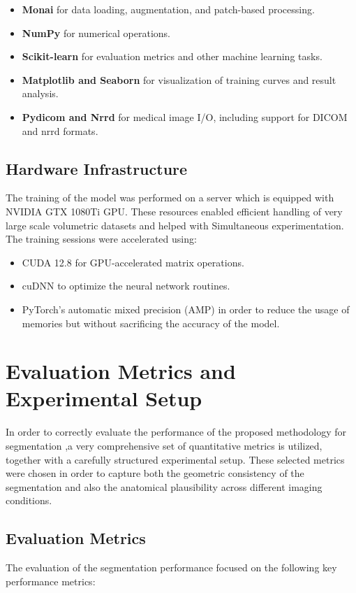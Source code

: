 \begin{itemize} \item \textbf{Monai} for data loading, augmentation, and patch-based processing. \item \textbf{NumPy} for numerical operations. \item \textbf{Scikit-learn} for evaluation metrics and other machine learning tasks. \item \textbf{Matplotlib and Seaborn} for visualization of training curves and result analysis. \item \textbf{Pydicom and Nrrd} for medical image I/O, including support for DICOM and nrrd formats. \end{itemize}

\subsection{Hardware Infrastructure}
The training of the model was performed on a server which is equipped with NVIDIA GTX 1080Ti GPU. These resources enabled efficient handling of very large scale volumetric datasets and helped with Simultaneous experimentation. The training sessions were accelerated using:

\begin{itemize} \item CUDA 12.8 for GPU-accelerated matrix operations. \item cuDNN to optimize the neural network routines. \item PyTorch's automatic mixed precision (AMP) in order to reduce the usage of memories but without sacrificing the accuracy of the model. \end{itemize}

\section{Evaluation Metrics and Experimental Setup}
In order to correctly evaluate the performance of the proposed methodology for segmentation ,a very comprehensive set of quantitative metrics is utilized, together with a carefully structured experimental setup. These selected metrics were chosen in order to capture both the geometric consistency of the segmentation and also the anatomical plausibility across different imaging conditions.

\subsection{Evaluation Metrics}
The evaluation of the segmentation performance focused on the following key performance metrics:

